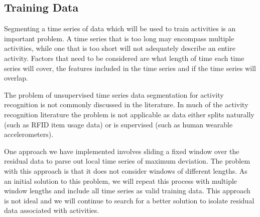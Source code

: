 \subsection{Training Data}
Segmenting a time series of data which will be used to train activities is an important problem.  A time series that is too long may encompass multiple activities, while one that is too short will not adequately describe an entire activity.  Factors that need to be considered are what length of time each time series will cover, the features included in the time series and if the time series will overlap.  

The problem of unsupervised time series data segmentation for activity recognition is not commonly discussed in the literature.  In much of the activity recognition literature the problem is not applicable as data either splits naturally (such as RFID item usage data) or is supervised (such as human wearable accelerometers).

One approach we have implemented involves sliding a fixed window over the residual data to parse out local time series of maximum deviation.  The problem with this approach is that it does not consider windows of different lengths.  As an initial solution to this problem, we will repeat this process with multiple window lengths and include all time series as valid training data.  This approach is not ideal and we will continue to search for a better solution to isolate residual data associated with activities.



